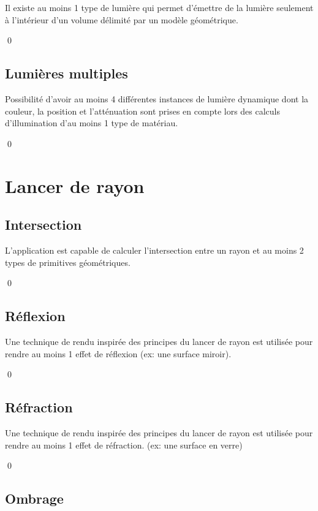 \documentclass[12pt]{article}
\newcommand{\state}{\noindent}
\begin{document}
\state
Il existe au moins 1 type de lumière qui permet d'émettre de la lumière seulement à l'intérieur d'un volume délimité par un modèle géométrique.

\qed

\subsection{Lumières multiples}

\state
Possibilité d'avoir au moins 4 différentes instances de lumière dynamique dont la couleur, la position et l'atténuation sont prises en compte lors des calculs d'illumination d'au moins 1 type de matériau.

\qed

\pagebreak

\section{Lancer de rayon}

\subsection{Intersection}

\state
L'application est capable de calculer l'intersection entre un rayon et au moins 2 types de primitives géométriques.

\qed

\subsection{Réflexion}

\state
Une technique de rendu inspirée des principes du lancer de rayon est utilisée pour rendre au moins 1 effet de réflexion (ex: une surface miroir).

\qed

\subsection{Réfraction}

\state
Une technique de rendu inspirée des principes du lancer de rayon est utilisée pour rendre au moins 1 effet de réfraction. (ex: une surface en verre)

\qed

\subsection{Ombrage}
\end{document}
